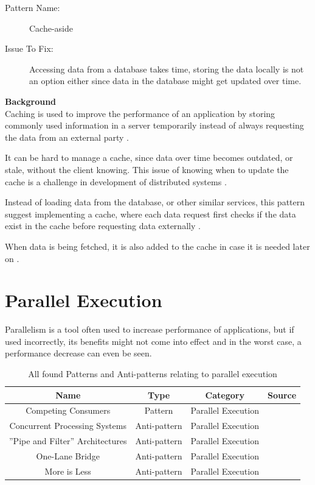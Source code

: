 \documentclass[a4paper,UKenglish]{dagrep}
\newcommand{\pattern}[6]{
\begin{center}
  \begin{patt}
    \begin{description}
      \item[Pattern Name:]#1
      \ifthenelse{#2 = 0}{~}{\item[Also Known As:]#3}
      \item[Issue To Fix:]#5
    \end{description}
  \end{patt}
\end{center}
  \textbf{Background}\\#6

  }
\begin{document}
\pattern{Cache-aside \cite{microsoft2024performanceefficiency}}{0}{}{}{Accessing data from a database takes time, storing the data locally is not an option either since data in the database might get updated over time.}{
	Caching is used to improve the performance of an application by storing commonly used information in a server temporarily instead of always requesting the data from an external party \cite{wessels2001webcaching}.

	It can be hard to manage a cache, since data over time becomes outdated, or stale, without the client knowing. This issue of knowing when to update the cache is a challenge in development of distributed systems \cite{microsoft2024performanceefficiency}.

	Instead of loading data from the database, or other similar services, this pattern suggest implementing a cache, where each data request first checks if the data exist in the cache before requesting data externally \cite{microsoft2024performanceefficiency}.

	When data is being fetched, it is also added to the cache in case it is needed later on \cite{microsoft2024performanceefficiency}.
}







\section{Parallel Execution}

Parallelism is a tool often used to increase performance  of applications\cite{mak1997parallelism}, but if used incorrectly, its benefits might not come into effect and in the worst case, a performance decrease can even be seen.




\begin{table}[H]
	\begin{tabular}{c|ccc}
		Name                       & Type    & Category           & Source                                    \\\hline
		Competing Consumers        & Pattern & Parallel Execution & \cite{microsoft2024performanceefficiency} \\
		Concurrent Processing Systems     & Anti-pattern & Parallel Execution & \cite{detect_antipatterns}                              \\
		''Pipe and Filter'' Architectures & Anti-pattern & Parallel Execution & \cite{detect_antipatterns}                              \\
		One-Lane Bridge                   & Anti-pattern & Parallel Execution & \cite{detect_antipatterns}                              \\
		More is Less                      & Anti-pattern & Parallel Execution & \cite{detect_antipatterns}                              \\
	\end{tabular}
	\caption{All found Patterns and Anti-patterns relating to parallel execution}
	\label{tab:patterns}
\end{table}
\end{document}
